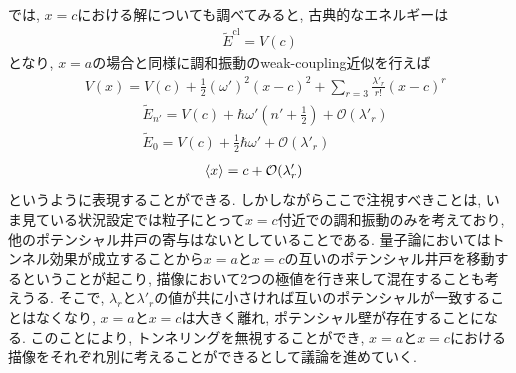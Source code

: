\documentclass[dvipdfmx,11pt,a4paper,oneside,openany]{jsbook}
\begin{document}
では, $x=c$における解についても調べてみると, 古典的なエネルギーは
\begin{align}
    \tilde{E}^{\text{cl}}=V(c)
\end{align}
となり, $x=a$の場合と同様に調和振動のweak-coupling近似を行えば
\begin{align}
     & V(x)=V(c)+\frac{1}{2}(\omega')^2(x-c)^2+\sum_{r=3}\frac{\lambda'_r}{r!}(x-c)^r
\end{align}
\begin{subequations}
    \begin{align}
         & \tilde{E}_{n'}=V(c)+\hbar\omega'\left(n'+\frac{1}{2}\right)+\mathcal{O}(\lambda'_r) \\
         & \tilde{E}_{0}=V(c)+\frac{1}{2}\hbar\omega'+\mathcal{O}(\lambda'_r)
    \end{align}
\end{subequations}
\begin{align}
     & \braket{x}=c+\mathcal{O}(\lambda'_r)
\end{align}
というように表現することができる. しかしながらここで注視すべきことは, いま見ている状況設定では粒子にとって$x=c$付近での調和振動のみを考えており, 他のポテンシャル井戸の寄与はないとしていることである. 量子論においてはトンネル効果が成立することから$x=a$と$x=c$の互いのポテンシャル井戸を移動するということが起こり, 描像において2つの極値を行き来して混在することも考えうる. そこで, $\lambda_r$と$\lambda'_r$の値が共に小さければ互いのポテンシャルが一致することはなくなり, $x=a$と$x=c$は大きく離れ, ポテンシャル壁が存在することになる. このことにより, トンネリングを無視することができ, $x=a$と$x=c$における描像をそれぞれ別に考えることができるとして議論を進めていく.
\end{document}
